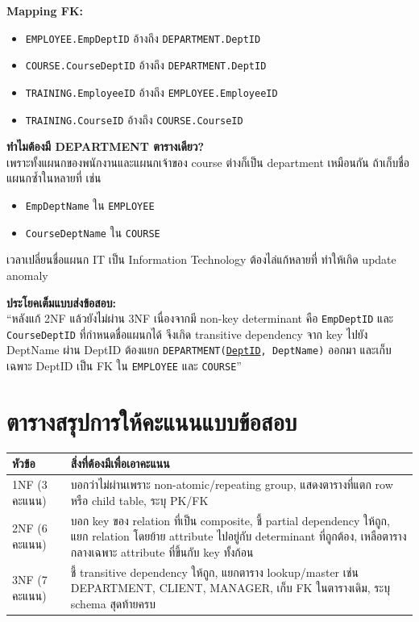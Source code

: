 \documentclass[a4paper,12pt]{article}
\newcommand{\pk}[1]{\uline{#1}}
\newcommand{\schema}[1]{\texttt{#1}}
\begin{document}
\textbf{Mapping FK:}
\begin{itemize}
    \item \schema{EMPLOYEE.EmpDeptID} อ้างถึง \schema{DEPARTMENT.DeptID}
    \item \schema{COURSE.CourseDeptID} อ้างถึง \schema{DEPARTMENT.DeptID}
    \item \schema{TRAINING.EmployeeID} อ้างถึง \schema{EMPLOYEE.EmployeeID}
    \item \schema{TRAINING.CourseID} อ้างถึง \schema{COURSE.CourseID}
\end{itemize}

\textbf{ทำไมต้องมี DEPARTMENT ตารางเดียว?}\\
เพราะทั้งแผนกของพนักงานและแผนกเจ้าของ course ต่างก็เป็น department เหมือนกัน ถ้าเก็บชื่อแผนกซ้ำในหลายที่ เช่น
\begin{itemize}
    \item \schema{EmpDeptName} ใน \schema{EMPLOYEE}
    \item \schema{CourseDeptName} ใน \schema{COURSE}
\end{itemize}
เวลาเปลี่ยนชื่อแผนก IT เป็น Information Technology ต้องไล่แก้หลายที่ ทำให้เกิด update anomaly

\textbf{ประโยคเต็มแบบส่งข้อสอบ:}\\
``หลังแก้ 2NF แล้วยังไม่ผ่าน 3NF เนื่องจากมี non-key determinant คือ \schema{EmpDeptID} และ \schema{CourseDeptID} ที่กำหนดชื่อแผนกได้ จึงเกิด transitive dependency จาก key ไปยัง DeptName ผ่าน DeptID ต้องแยก \schema{DEPARTMENT(\pk{DeptID}, DeptName)} ออกมา และเก็บเฉพาะ DeptID เป็น FK ใน \schema{EMPLOYEE} และ \schema{COURSE}''

\newpage
\section*{ตารางสรุปการให้คะแนนแบบข้อสอบ}

\begin{center}
\renewcommand{\arraystretch}{1.25}
\begin{tabular}{|p{3.0cm}|p{10.8cm}|}
    \hline
    \rowcolor{gray!20}
    \textbf{หัวข้อ} & \textbf{สิ่งที่ต้องมีเพื่อเอาคะแนน} \\
    \hline
    1NF (3 คะแนน) & บอกว่าไม่ผ่านเพราะ non-atomic/repeating group, แสดงตารางที่แตก row หรือ child table, ระบุ PK/FK \\
    \hline
    2NF (6 คะแนน) & บอก key ของ relation ที่เป็น composite, ชี้ partial dependency ให้ถูก, แยก relation โดยย้าย attribute ไปอยู่กับ determinant ที่ถูกต้อง, เหลือตารางกลางเฉพาะ attribute ที่ขึ้นกับ key ทั้งก้อน \\
    \hline
    3NF (7 คะแนน) & ชี้ transitive dependency ให้ถูก, แยกตาราง lookup/master เช่น DEPARTMENT, CLIENT, MANAGER, เก็บ FK ในตารางเดิม, ระบุ schema สุดท้ายครบ \\
    \hline
\end{tabular}
\end{center}
\end{document}
